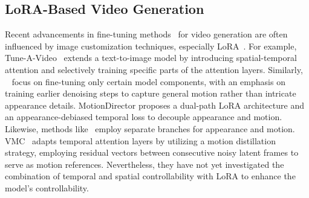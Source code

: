 \subsection{LoRA-Based Video Generation}
Recent advancements in fine-tuning methods~\cite{wu2024motionbooth,wu2024customcrafter,wang2024customvideo,guo2023animatediff,wang2024motionctrl,ouyang2024i2vedit} for video generation are often influenced by image customization techniques, especially LoRA~\cite{hu2021lora}. For example, Tune-A-Video~\cite{wu2023tune} extends a text-to-image model by introducing spatial-temporal attention and selectively training specific parts of the attention layers. Similarly, ~\cite{materzynska2023customizing} focus on fine-tuning only certain model components, with an emphasis on training earlier denoising steps to capture general motion rather than intricate appearance details. MotionDirector\cite{zhao2025motiondirector} proposes a dual-path LoRA architecture and an appearance-debiased temporal loss to decouple appearance and motion. Likewise, methods like~\cite{wei2024dreamvideo, zhang2023motioncrafter, ren2024customize} employ separate branches for appearance and motion. VMC~\cite{jeong2024vmc} adapts temporal attention layers by utilizing a motion distillation strategy, employing residual vectors between consecutive noisy latent frames to serve as motion references. Nevertheless, they have not yet investigated the combination of temporal and spatial controllability with LoRA to enhance the model's controllability.